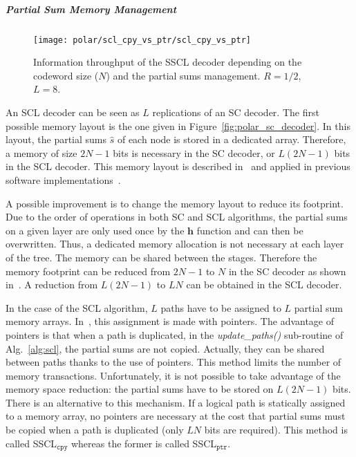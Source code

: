 \subparagraph{Partial Sum Memory Management}

\begin{figure}
  \centering
  \texttt{[image: polar/scl\_cpy\_vs\_ptr/scl\_cpy\_vs\_ptr]}
  \caption{Information throughput of the SSCL decoder depending on the codeword
    size ($N$) and the partial sums management. $R = 1 / 2$, $L = 8$.}
  \label{plot:polar_scl_cpy_vs_ptr}
\end{figure}

An SCL decoder can be seen as $L$ replications of an SC decoder. The first
possible memory layout is the one given in Figure~\ref{fig:polar_sc_decoder}. In
this layout, the partial sums $\hat{s}$ of each node is stored in a dedicated
array. Therefore, a memory of size $2N-1$ bits is necessary in the SC decoder,
or $L(2N -1)$ bits in the SCL decoder. This memory layout is described
in~\cite{Tal2011} and applied in previous software
implementations~\cite{Sarkis2014b,Sarkis2016,Shen2016}.

A possible improvement is to change the memory layout to reduce its footprint.
Due to the order of operations in both SC and SCL algorithms, the partial sums
on a given layer are only used once by the $\bm{h}$ function and can then be
overwritten. Thus, a dedicated memory allocation is not necessary at each layer
of the tree. The memory can be shared between the stages. Therefore the memory
footprint can be reduced from $2N-1$ to $N$ in the SC decoder as shown
in~\cite{Leroux2013}. A reduction from $L(2N -1)$ to $LN$ can be obtained in the
SCL decoder.

In the case of the SCL algorithm, $L$ paths have to be assigned to $L$ partial
sum memory arrays. In~\cite{Tal2011}, this assignment is made with pointers. The
advantage of pointers is that when a path is duplicated, in the
\textit{update\_paths()} sub-routine of Alg.~\ref{alg:scl}, the partial sums are
not copied. Actually, they can be shared between paths thanks to the use of
pointers. This method limits the number of memory transactions. Unfortunately,
it is not possible to take advantage of the memory space reduction: the partial
sums have to be stored on $L(2N -1)$ bits. There is an alternative to this
mechanism. If a logical path is statically assigned to a memory array, no
pointers are necessary at the cost that partial sums must be copied when a path
is duplicated (only $LN$ bits are required). This method is called
SSCL$_{\texttt{cpy}}$ whereas the former is called SSCL$_{\texttt{ptr}}$.

